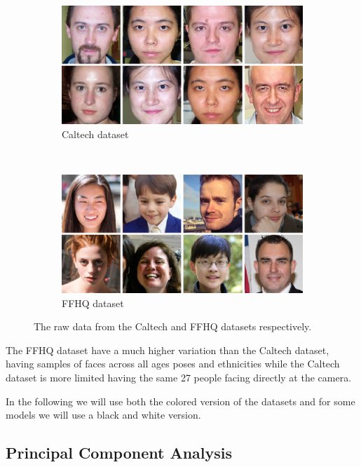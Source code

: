 \begin{figure}[h!]
    \centering
    \begin{subfigure}[b]{0.45\textwidth}
        \includegraphics[width=\textwidth]{fig/data/caltech}
        \caption{Caltech dataset}
        \label{raw-caltech}
    \end{subfigure}
    ~
    \begin{subfigure}[b]{0.45\textwidth}
        \includegraphics[width=\textwidth]{fig/data/ffhq}
        \caption{FFHQ dataset}
        \label{raw-ffhq}
    \end{subfigure}

    \caption{The raw data from the Caltech and FFHQ datasets respectively.}
    \label{rawdata}
\end{figure}

The FFHQ dataset have a much higher variation than the Caltech dataset, having samples of faces across all ages poses and ethnicities while the Caltech dataset is more limited having the same 27 people facing directly at the camera.

In the following we will use both the colored version of the datasets and for some models we will use a black and white version.

\subsection{Principal Component Analysis}

